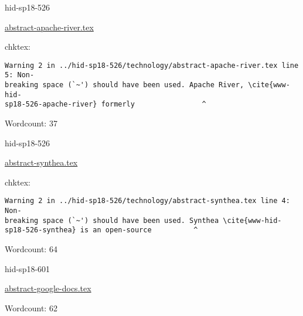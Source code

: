 

\begin{IU}

hid-sp18-526

\href{https://github.com/cloudmesh-community/hid-sp18-526/blob/master//technology/abstract-apache-river.tex}{abstract-apache-river.tex}

 
chktex:
\begin{tiny}
\begin{verbatim}
Warning 2 in ../hid-sp18-526/technology/abstract-apache-river.tex line 5: Non-
breaking space (`~') should have been used. Apache River, \cite{www-hid-
sp18-526-apache-river} formerly                ^
\end{verbatim}
\end{tiny}

Wordcount: 37

\end{IU}



\begin{IU}

hid-sp18-526

\href{https://github.com/cloudmesh-community/hid-sp18-526/blob/master//technology/abstract-synthea.tex}{abstract-synthea.tex}

 
chktex:
\begin{tiny}
\begin{verbatim}
Warning 2 in ../hid-sp18-526/technology/abstract-synthea.tex line 4: Non-
breaking space (`~') should have been used. Synthea \cite{www-hid-
sp18-526-synthea} is an open-source          ^
\end{verbatim}
\end{tiny}

Wordcount: 64

\end{IU}



\begin{IU}

hid-sp18-601

\href{https://github.com/cloudmesh-community/hid-sp18-601/blob/master//technology/abstract-google-docs.tex}{abstract-google-docs.tex}

 

Wordcount: 62

\end{IU}


